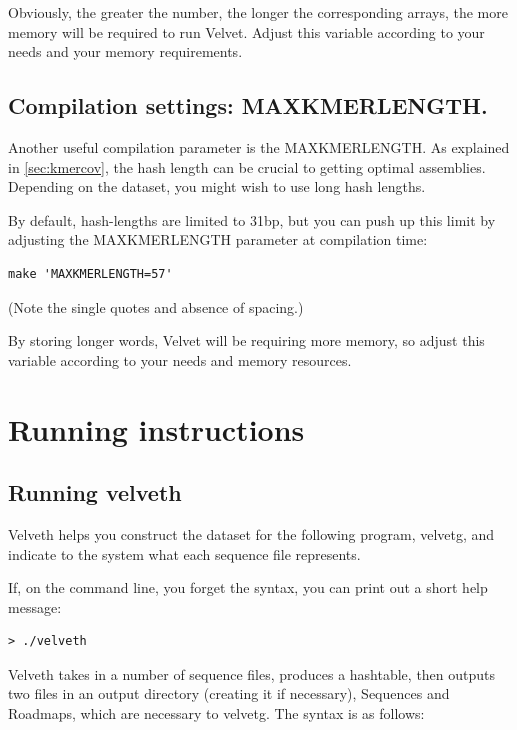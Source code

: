 \documentclass{article}
\begin{document}
Obviously, the greater the number, the longer the corresponding arrays, the more memory will be required to run Velvet. Adjust this variable according to your needs and your memory requirements. 

\subsection{Compilation settings: MAXKMERLENGTH.}

\label{sec:maxlength}

Another useful compilation parameter is the MAXKMERLENGTH. As explained in \ref{sec:kmercov}, the hash length can be crucial to getting optimal assemblies. Depending on the dataset, you might wish to use long hash lengths. 

By default, hash-lengths are limited to 31bp, but you can push up this limit by adjusting the MAXKMERLENGTH parameter at compilation time:

\begin{verbatim}
make 'MAXKMERLENGTH=57'
\end{verbatim}

(Note the single quotes and absence of spacing.)

By storing longer words, Velvet will be requiring more memory, so adjust this variable according to your needs and memory resources. 

\section{Running instructions}

\subsection{Running velveth}

Velveth helps you construct the dataset for the following program, velvetg, and indicate to the system what  each sequence file represents.

If, on the command line, you forget the syntax, you can print out a short help message:
\begin{verbatim}
> ./velveth
\end{verbatim}

\label{sec:hashing}

Velveth takes in a number of sequence files, produces a hashtable, then outputs two files in an output directory (creating it if necessary), Sequences and Roadmaps, which are necessary to velvetg. The syntax is as follows:
\end{document}

